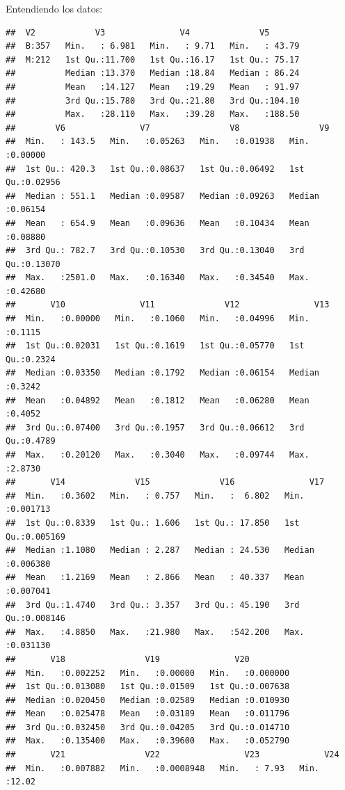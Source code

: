\documentclass[ignorenonframetext,]{beamer}
\begin{document}
\begin{frame}[fragile]
\begin{block}{Entendiendo los datos:}
\begin{verbatim}
##  V2            V3               V4              V5        
##  B:357   Min.   : 6.981   Min.   : 9.71   Min.   : 43.79  
##  M:212   1st Qu.:11.700   1st Qu.:16.17   1st Qu.: 75.17  
##          Median :13.370   Median :18.84   Median : 86.24  
##          Mean   :14.127   Mean   :19.29   Mean   : 91.97  
##          3rd Qu.:15.780   3rd Qu.:21.80   3rd Qu.:104.10  
##          Max.   :28.110   Max.   :39.28   Max.   :188.50  
##        V6               V7                V8                V9         
##  Min.   : 143.5   Min.   :0.05263   Min.   :0.01938   Min.   :0.00000  
##  1st Qu.: 420.3   1st Qu.:0.08637   1st Qu.:0.06492   1st Qu.:0.02956  
##  Median : 551.1   Median :0.09587   Median :0.09263   Median :0.06154  
##  Mean   : 654.9   Mean   :0.09636   Mean   :0.10434   Mean   :0.08880  
##  3rd Qu.: 782.7   3rd Qu.:0.10530   3rd Qu.:0.13040   3rd Qu.:0.13070  
##  Max.   :2501.0   Max.   :0.16340   Max.   :0.34540   Max.   :0.42680  
##       V10               V11              V12               V13        
##  Min.   :0.00000   Min.   :0.1060   Min.   :0.04996   Min.   :0.1115  
##  1st Qu.:0.02031   1st Qu.:0.1619   1st Qu.:0.05770   1st Qu.:0.2324  
##  Median :0.03350   Median :0.1792   Median :0.06154   Median :0.3242  
##  Mean   :0.04892   Mean   :0.1812   Mean   :0.06280   Mean   :0.4052  
##  3rd Qu.:0.07400   3rd Qu.:0.1957   3rd Qu.:0.06612   3rd Qu.:0.4789  
##  Max.   :0.20120   Max.   :0.3040   Max.   :0.09744   Max.   :2.8730  
##       V14              V15              V16               V17          
##  Min.   :0.3602   Min.   : 0.757   Min.   :  6.802   Min.   :0.001713  
##  1st Qu.:0.8339   1st Qu.: 1.606   1st Qu.: 17.850   1st Qu.:0.005169  
##  Median :1.1080   Median : 2.287   Median : 24.530   Median :0.006380  
##  Mean   :1.2169   Mean   : 2.866   Mean   : 40.337   Mean   :0.007041  
##  3rd Qu.:1.4740   3rd Qu.: 3.357   3rd Qu.: 45.190   3rd Qu.:0.008146  
##  Max.   :4.8850   Max.   :21.980   Max.   :542.200   Max.   :0.031130  
##       V18                V19               V20          
##  Min.   :0.002252   Min.   :0.00000   Min.   :0.000000  
##  1st Qu.:0.013080   1st Qu.:0.01509   1st Qu.:0.007638  
##  Median :0.020450   Median :0.02589   Median :0.010930  
##  Mean   :0.025478   Mean   :0.03189   Mean   :0.011796  
##  3rd Qu.:0.032450   3rd Qu.:0.04205   3rd Qu.:0.014710  
##  Max.   :0.135400   Max.   :0.39600   Max.   :0.052790  
##       V21                V22                 V23             V24       
##  Min.   :0.007882   Min.   :0.0008948   Min.   : 7.93   Min.   :12.02  

\end{verbatim}
\end{block}
\end{frame}
\end{document}
